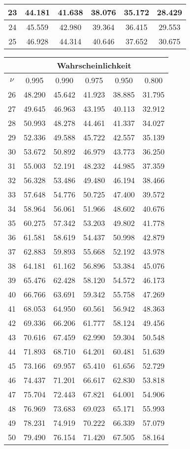 \begin{small}
\begin{tabular}{c||c|c|c|c|c|}
23 & 44.181 & 41.638 & 38.076 & 35.172 & 28.429 \\
\hline
24 & 45.559 & 42.980 & 39.364 & 36.415 & 29.553 \\
\hline
25 & 46.928 & 44.314 & 40.646 & 37.652 & 30.675 \\
\hline
\end{tabular}
\hspace{2mm}
\begin{tabular}{c||c|c|c|c|c|}
 & \multicolumn{5}{c|}{Wahrscheinlichkeit}\\
\hline
$\nu$ & 0.995 & 0.990 & 0.975 & 0.950 & 0.800 \\
\hline\hline
26 & 48.290 & 45.642 & 41.923 & 38.885 & 31.795 \\
\hline
27 & 49.645 & 46.963 & 43.195 & 40.113 & 32.912 \\
\hline
28 & 50.993 & 48.278 & 44.461 & 41.337 & 34.027 \\
\hline
29 & 52.336 & 49.588 & 45.722 & 42.557 & 35.139 \\
\hline
30 & 53.672 & 50.892 & 46.979 & 43.773 & 36.250 \\
\hline
31 & 55.003 & 52.191 & 48.232 & 44.985 & 37.359 \\
\hline
32 & 56.328 & 53.486 & 49.480 & 46.194 & 38.466 \\
\hline
33 & 57.648 & 54.776 & 50.725 & 47.400 & 39.572 \\
\hline
34 & 58.964 & 56.061 & 51.966 & 48.602 & 40.676 \\
\hline
35 & 60.275 & 57.342 & 53.203 & 49.802 & 41.778 \\
\hline
36 & 61.581 & 58.619 & 54.437 & 50.998 & 42.879 \\
\hline
37 & 62.883 & 59.893 & 55.668 & 52.192 & 43.978 \\
\hline
38 & 64.181 & 61.162 & 56.896 & 53.384 & 45.076 \\
\hline
39 & 65.476 & 62.428 & 58.120 & 54.572 & 46.173 \\
\hline
40 & 66.766 & 63.691 & 59.342 & 55.758 & 47.269 \\
\hline
41 & 68.053 & 64.950 & 60.561 & 56.942 & 48.363 \\
\hline
42 & 69.336 & 66.206 & 61.777 & 58.124 & 49.456 \\
\hline
43 & 70.616 & 67.459 & 62.990 & 59.304 & 50.548 \\
\hline
44 & 71.893 & 68.710 & 64.201 & 60.481 & 51.639 \\
\hline
45 & 73.166 & 69.957 & 65.410 & 61.656 & 52.729 \\
\hline
46 & 74.437 & 71.201 & 66.617 & 62.830 & 53.818 \\
\hline
47 & 75.704 & 72.443 & 67.821 & 64.001 & 54.906 \\
\hline
48 & 76.969 & 73.683 & 69.023 & 65.171 & 55.993 \\
\hline
49 & 78.231 & 74.919 & 70.222 & 66.339 & 57.079 \\
\hline
50 & 79.490 & 76.154 & 71.420 & 67.505 & 58.164 \\
\hline
\end{tabular}
\end{small}

